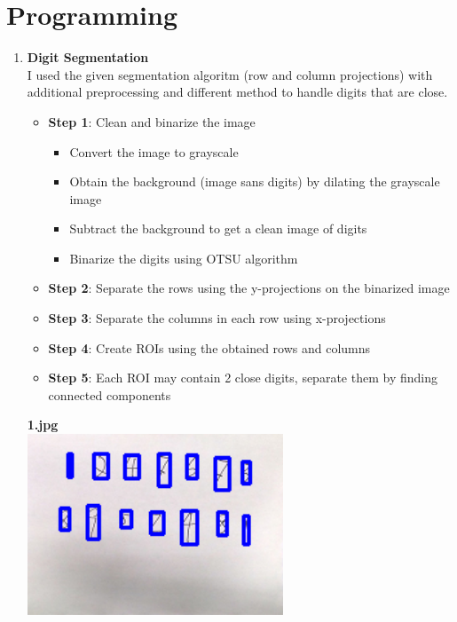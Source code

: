 \documentclass[12pt,a4paper]{article}
\begin{document}
	\pagebreak
	\section*{Programming}
	\begin{enumerate}
		\item \textbf{Digit Segmentation} \\
		I used the given segmentation algoritm (row and column projections) with additional preprocessing and different method to handle digits that are close. \\

		\begin{itemize}
			\item \textbf{Step 1}: Clean and binarize the image
			\begin{itemize}
				\item Convert the image to grayscale
				\item Obtain the background (image sans digits) by dilating the grayscale image
				\item Subtract the background to get a clean image of digits
				\item Binarize the digits using OTSU algorithm
			\end{itemize}
			\item \textbf{Step 2}: Separate the rows using the y-projections on the binarized image
			\item \textbf{Step 3}: Separate the columns in each row using x-projections
			\item \textbf{Step 4}: Create ROIs using the obtained rows and columns
			\item \textbf{Step 5}: Each ROI may contain 2 close digits, separate them by finding connected components
		\end{itemize}

		\textbf{1.jpg} \\
		\includegraphics[width=0.6\textwidth]{./result_images/digits_of_image_1/1_segmented.png}


\end{enumerate}
\end{document}
